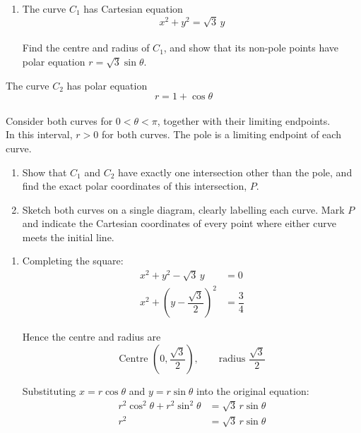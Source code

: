 \documentclass[leqno]{article}
\begin{document}
\begin{enumerate}[
  label=\textbf{\arabic*.},
  leftmargin=*,
  topsep=0pt,
  partopsep=0pt,
  parsep=0pt
]
\begin{enumerate}[label=\textbf{(\alph*)}]
\item The curve $C_1$ has Cartesian equation
\[
x^2+y^2=\sqrt{3}\,y
\] \\
Find the centre and radius of $C_1$, and show that its non-pole points have polar equation $r=\sqrt{3}\sin\theta$.  \\
\end{enumerate}
The curve $C_2$ has polar equation
\[
r=1+\cos\theta
\] \\
Consider both curves for $0<\theta<\pi$, together with their limiting endpoints. \\
In this interval, $r>0$ for both curves. The pole is a limiting endpoint of each curve. \\
\begin{enumerate}[label=\textbf{(\alph*)}, resume]
\item Show that $C_1$ and $C_2$ have exactly one intersection other than the pole, and find the exact polar coordinates of this intersection, $P$.  \\
\item Sketch both curves on a single diagram, clearly labelling each curve. Mark $P$ and indicate the Cartesian coordinates of every point where either curve meets the initial line.  \\
\end{enumerate}

\vspace*{10pt}

\begin{djsSolution}
\begin{enumerate}[label=\textbf{(\alph*)}, start=1]
\item Completing the square:
\begin{align*}
x^2+y^2-\sqrt{3}\,y&=0\\
x^2+\left(y-\dfrac{\sqrt{3}}{2}\right)^2&=\dfrac{3}{4}
\end{align*}

Hence the centre and radius are
\[
\text{Centre }\left(0,\dfrac{\sqrt{3}}{2}\right),\qquad
\text{radius }\dfrac{\sqrt{3}}{2}
\]

Substituting \(x=r\cos\theta\) and \(y=r\sin\theta\) into the original equation:
\begin{align*}
r^2\cos^2\theta+r^2\sin^2\theta&=\sqrt{3}\,r\sin\theta\\
r^2&=\sqrt{3}\,r\sin\theta
\end{align*}


\end{enumerate}
\end{djsSolution}
\end{enumerate}
\end{document}
